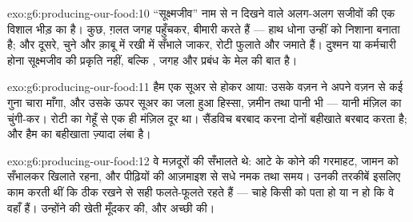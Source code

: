 \begin{solution}{exo:g6:producing-our-food:10}
``सूक्ष्मजीव'' नाम  से न दिखने वाले अलग-अलग सजीवों की एक विशाल
भीड़ का है। कुछ, ग़लत जगह पहुँचकर, बीमारी करते हैं --- हाथ धोना उन्हीं
को निशाना बनाता है; और दूसरे, चुने और क़ाबू में रखी  में
सँभाले जाकर, रोटी फुलाते और  जमाते हैं। दुश्मन या कर्मचारी होना
सूक्ष्मजीव की प्रकृति नहीं, बल्कि , जगह और प्रबंध के मेल की बात
है।
\end{solution}

\begin{solution}{exo:g6:producing-our-food:11}
हैम एक सूअर से होकर आया: उसके वज़न ने अपने वज़न से कई गुना चारा माँगा,
और उसके ऊपर सूअर का जला हुआ हिस्सा, ज़मीन तथा पानी भी --- यानी
 मंज़िल का चुंगी-कर। रोटी का गेहूँ  से एक ही मंज़िल दूर
था। सैंडविच बरबाद करना दोनों बहीखाते बरबाद करता है; और हैम का बहीखाता
ज़्यादा लंबा है।
\end{solution}

\begin{solution}{exo:g6:producing-our-food:12}
वे मज़दूरों की \emph{} सँभालते थे: आटे के कोने की गरमाहट,
जामन को सँभालकर खिलाते रहना, और पीढ़ियों की आज़माइश से सधे नमक तथा समय।
उनकी तरकीबें इसलिए काम करती थीं कि  ठीक रखने से सही 
फलते-फूलते रहते हैं --- चाहे किसी को पता हो या न हो कि वे  वहाँ
हैं। उन्होंने  की खेती  मूँदकर की, और अच्छी की।
\end{solution}

